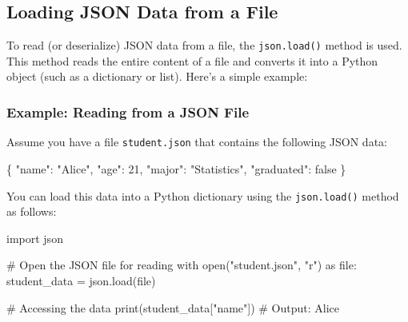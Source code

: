 \documentclass[
  letterpaper,
  DIV=11,
  numbers=noendperiod]{scrreprt}
\newenvironment{Shaded}{\begin{snugshade}}{\end{snugshade}}
\newcommand{\BuiltInTok}[1]{\textcolor[rgb]{0.00,0.23,0.31}{#1}}
\newcommand{\CommentTok}[1]{\textcolor[rgb]{0.37,0.37,0.37}{#1}}
\newcommand{\ControlFlowTok}[1]{\textcolor[rgb]{0.00,0.23,0.31}{#1}}
\newcommand{\DataTypeTok}[1]{\textcolor[rgb]{0.68,0.00,0.00}{#1}}
\newcommand{\DecValTok}[1]{\textcolor[rgb]{0.68,0.00,0.00}{#1}}
\newcommand{\FunctionTok}[1]{\textcolor[rgb]{0.28,0.35,0.67}{#1}}
\newcommand{\ImportTok}[1]{\textcolor[rgb]{0.00,0.46,0.62}{#1}}
\newcommand{\KeywordTok}[1]{\textcolor[rgb]{0.00,0.23,0.31}{#1}}
\newcommand{\NormalTok}[1]{\textcolor[rgb]{0.00,0.23,0.31}{#1}}
\newcommand{\OperatorTok}[1]{\textcolor[rgb]{0.37,0.37,0.37}{#1}}
\newcommand{\StringTok}[1]{\textcolor[rgb]{0.13,0.47,0.30}{#1}}
\begin{document}
\hypertarget{loading-json-data-from-a-file}{%
\subsection{Loading JSON Data from a
File}\label{loading-json-data-from-a-file}}

To read (or deserialize) JSON data from a file, the \texttt{json.load()}
method is used. This method reads the entire content of a file and
converts it into a Python object (such as a dictionary or list). Here's
a simple example:

\hypertarget{example-reading-from-a-json-file}{%
\subsubsection{Example: Reading from a JSON
File}\label{example-reading-from-a-json-file}}

Assume you have a file \texttt{student.json} that contains the following
JSON data:

\begin{Shaded}
\begin{Highlighting}[]
\FunctionTok{\{}
    \DataTypeTok{"name"}\FunctionTok{:} \StringTok{"Alice"}\FunctionTok{,}
    \DataTypeTok{"age"}\FunctionTok{:} \DecValTok{21}\FunctionTok{,}
    \DataTypeTok{"major"}\FunctionTok{:} \StringTok{"Statistics"}\FunctionTok{,}
    \DataTypeTok{"graduated"}\FunctionTok{:} \KeywordTok{false}
\FunctionTok{\}}
\end{Highlighting}
\end{Shaded}

You can load this data into a Python dictionary using the
\texttt{json.load()} method as follows:

\begin{Shaded}
\begin{Highlighting}[]
\ImportTok{import}\NormalTok{ json}

\CommentTok{\# Open the JSON file for reading}
\ControlFlowTok{with} \BuiltInTok{open}\NormalTok{(}\StringTok{"student.json"}\NormalTok{, }\StringTok{"r"}\NormalTok{) }\ImportTok{as} \BuiltInTok{file}\NormalTok{:}
\NormalTok{    student\_data }\OperatorTok{=}\NormalTok{ json.load(}\BuiltInTok{file}\NormalTok{)}

\CommentTok{\# Accessing the data}
\BuiltInTok{print}\NormalTok{(student\_data[}\StringTok{"name"}\NormalTok{])  }\CommentTok{\# Output: Alice}
\end{Highlighting}
\end{Shaded}
\end{document}

